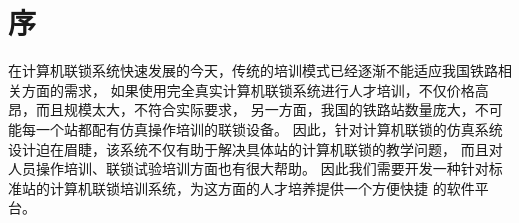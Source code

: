 \section{序}
在计算机联锁系统快速发展的今天，传统的培训模式已经逐渐不能适应我国铁路相关方面的需求，
如果使用完全真实计算机联锁系统进行人才培训，不仅价格高昂，而且规模太大，不符合实际要求，
另一方面，我国的铁路站数量庞大，不可能每一个站都配有仿真操作培训的联锁设备。
因此，针对计算机联锁的仿真系统设计迫在眉睫，该系统不仅有助于解决具体站的计算机联锁的教学问题，
而且对人员操作培训、联锁试验培训方面也有很大帮助。
因此我们需要开发一种针对标准站的计算机联锁培训系统，为这方面的人才培养提供一个方便快捷
的软件平台。